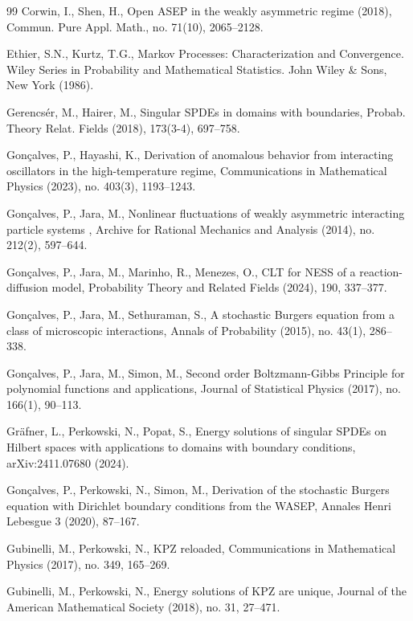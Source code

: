 \documentclass[a4paper, reqno, 12pt]{amsart}
\theoremstyle{plain}
\theoremstyle{definition}
\begin{document}
\begin{thebibliography}{99}
 Corwin, I., Shen, H., Open ASEP in the weakly asymmetric regime (2018), Commun. Pure Appl. Math., no. 71(10), 2065--2128.

 Ethier, S.N., Kurtz, T.G., Markov Processes: Characterization and Convergence. Wiley Series in Probability and Mathematical Statistics. John Wiley \& Sons, New York (1986). 


 Gerencs\'er, M., Hairer, M., Singular SPDEs in domains with boundaries, {Probab. Theory Relat. Fields}  (2018), 173(3-4), 697–758.

 Gon\c{c}alves, P., Hayashi, K., Derivation of anomalous behavior from interacting oscillators in the high-temperature regime, Communications in Mathematical Physics (2023), no. 403(3), 1193--1243.


 Gon\c{c}alves, P., Jara, M., Nonlinear fluctuations of weakly asymmetric interacting particle systems , Archive for Rational Mechanics and Analysis (2014),  no. 212(2), 597--644.

 Gon\c{c}alves, P., Jara, M., Marinho, R., Menezes, O., CLT for NESS of a reaction-diffusion model, Probability Theory and Related Fields (2024), 190,  337--377.

 Gon\c{c}alves, P., Jara, M., Sethuraman, S., A stochastic Burgers equation from a class of microscopic interactions, Annals of Probability (2015), no. 43(1), 286--338.

 Gon\c{c}alves, P., Jara, M., Simon, M., Second order Boltzmann-Gibbs Principle for polynomial functions and applications, Journal of Statistical Physics  (2017), no. 166(1), 90--113.

 Gr\"afner, L., Perkowski, N., Popat, S., Energy solutions of singular SPDEs on Hilbert spaces with applications to domains with boundary conditions, arXiv:2411.07680 (2024).

 Gon\c{c}alves, P., Perkowski, N., Simon, M., Derivation of the stochastic Burgers equation with Dirichlet boundary conditions from the WASEP, Annales Henri Lebesgue 3 (2020), 87--167.

 Gubinelli, M., Perkowski, N., KPZ reloaded, Communications in Mathematical Physics  (2017), no. 349, 165--269.

 Gubinelli, M., Perkowski, N., Energy solutions of KPZ are unique, Journal of the American Mathematical Society (2018), no. 31, 27--471.


\end{thebibliography}
\end{document}
